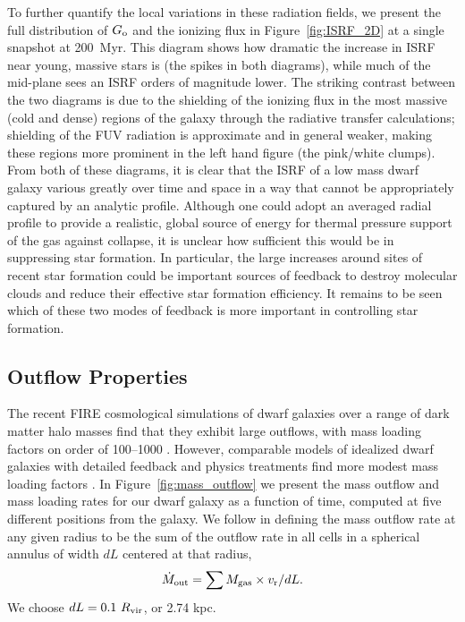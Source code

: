 \documentclass[twocolumn]{aastex61}
\begin{document}
To further quantify the local variations in these radiation fields, we present the full distribution of $G_{\rm o}$ and the  ionizing flux in Figure~\ref{fig:ISRF_2D} at a single snapshot at 200~Myr. This diagram shows how dramatic the increase in ISRF near young, massive stars is (the spikes in both diagrams), while much of the mid-plane sees an ISRF orders of magnitude lower. The striking contrast between the two diagrams is due to the shielding of the  ionizing flux in the most massive (cold and dense) regions of the galaxy through the radiative transfer calculations; shielding of the FUV radiation is approximate and in general weaker, making these regions more prominent in the left hand figure (the pink/white clumps). From both of these diagrams, it is clear that the ISRF of a low mass dwarf galaxy various greatly over time and space in a way that cannot be appropriately captured by an analytic profile. Although one could adopt an averaged radial profile to provide a realistic, global source of energy for thermal pressure support of the gas against collapse, it is unclear how sufficient this would be in suppressing star formation. In particular, the large increases around sites of recent star formation could be important sources of feedback to destroy molecular clouds and reduce their effective star formation efficiency. It 
   remains to be seen
which of these two modes of feedback is more important in controlling star formation.


\subsection{Outflow Properties}
\label{sec:outflows}

The recent FIRE cosmological simulations of dwarf galaxies over a range of dark matter halo masses find that they exhibit large outflows, with mass loading factors on order of 100--1000 \citep{Muratov2015}. However, comparable models of idealized dwarf galaxies with detailed feedback and physics treatments find more modest mass loading factors \citep{Hu2016,Hu2017}. In Figure~\ref{fig:mass_outflow} we present the mass outflow and mass loading rates for our dwarf galaxy as a function of time, computed at five different positions from the galaxy. We follow \citet{Muratov2015} in defining the mass outflow rate at any given radius to be the sum of the outflow rate in all cells in a spherical annulus of width $dL$ centered at that radius,
\begin{equation} \label{eq:dotM}
\dot{M}_{\rm out} = \sum M_{\rm gas} \times v_{\rm r} / dL.
\end{equation} 
We choose $dL = 0.1~R_{\rm vir}$, or 2.74 kpc. 
\end{document}
